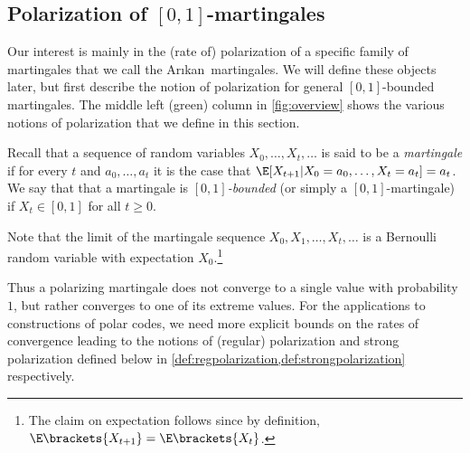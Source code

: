 \documentclass[11pt]{article}
\newcommand{\Arikan}{Ar\i kan}
\begin{document}
\subsection{Polarization of $[0,1]$-martingales}

Our interest is mainly in the (rate of) polarization of a specific family of martingales that we call the \Arikan\ martingales. We will define these objects later, but first describe the notion of polarization for general $[0,1]$-bounded martingales. The middle left (green) column in \cref{fig:overview} shows the various notions of polarization that we define in this section.


Recall that a sequence of random variables $X_0,\ldots,X_t,\ldots$ is said to be a {\em martingale} if for every $t$ and $a_0,\ldots,a_t$ it is the case that $\E[X_{t+1}| X_0 = a_0,\ldots,X_t = a_t] = a_t$. We say that that a martingale is {\em $[0,1]$-bounded} (or simply a $[0,1]$-martingale) if $X_t \in [0,1]$ for all $t \geq 0$.

Note that  the limit of the martingale sequence $X_0,X_1,\ldots,X_t,\ldots$ is a Bernoulli random variable with expectation $X_0$.\footnote{The claim on expectation follows since by definition, $\E\brackets{X_{t+1}}=\E\brackets{X_t}$.}

Thus a polarizing martingale does not converge to a single value with probability $1$, but rather converges to one of its extreme values. For the applications to constructions of polar codes, we need more explicit bounds on the rates of convergence leading to the notions of (regular) polarization and strong polarization defined below in \cref{def:regpolarization,def:strongpolarization} respectively.


\end{document}
